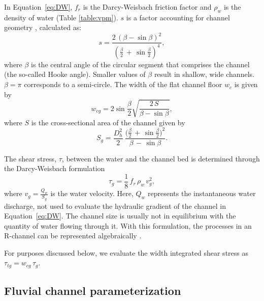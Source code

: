 \documentclass[11pt]{article}
\begin{document}
\begin{spacing}{1}
  In Equation~\ref{eq:DW}, $f_r$ is the Darcy-Weisbach friction factor and $\rho_w$ is the density of water (Table \ref{table:vpm}). $s$ is a factor accounting for channel geometry \citep{hooke1990}, calculated as:
  \begin{equation}
    \label{eq:Hf}
    s = \frac{2\,(\beta -\sin \beta)^2}{(\frac{\beta}{2}\,+\,\sin \frac{\beta}{2})^4},
  \end{equation}
  where $\beta$ is the central angle of the circular segment that comprises the channel (the so-called Hooke angle).
  Smaller values of $\beta$ result in shallow, wide channels. $\beta =\pi$ corresponds to a semi-circle.
  The width of the flat channel floor $w_c$ is given by
  \begin{equation}
    \label{eq:dh2wc}
    w_{cg} = 2  \sin \frac{\beta}{2} \sqrt{\frac{2\, S}{\beta -\sin \beta}},
  \end{equation}
  where $S$ is the cross-sectional area of the channel given by
  \begin{equation}
    \label{eq:dh2S}
    S_g =  \frac{D_h^2}{2}~ \frac{\Big(\frac{\beta}{2} \,+ \, \sin \frac{\beta}{2}\Big)^2  }{\beta\,-\,\sin \beta}.
  \end{equation}
  
  The shear stress, $\tau$, between the water and the channel bed is determined through the Darcy-Weisbach formulation
  \begin{equation}
    \label{eq:tau}
    \tau_g=\frac{1}{8}\,f_r\,\rho_w\,v_g^2,
  \end{equation}
  where $v_g = \frac{Q_w}{S_g}$ is the water velocity.
  Here, $Q_w$ represents the instantaneous water discharge, not used to evaluate the hydraulic gradient of the channel in Equation~\ref{eq:DW}.
  The channel size is usually not in equilibrium with the quantity of water flowing through it.
  With this formulation, the processes in an R-channel can be represented algebraically \citep{delaney2019}.
  
  For purposes discussed below, we evaluate the width integrated shear stress as $\tau_{tg}=w_{cg}\,\tau_g $.
  
  \subsection{Fluvial channel  parameterization}
  \label{sect:fluv}
  

\end{spacing}
\end{document}
